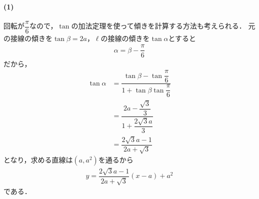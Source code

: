 \documentclass[../../main.tex]{subfiles}
\begin{document}
\paragraph{(1)}
回転が$\dfrac{\pi}{6}$なので，$\tan$の加法定理を使って傾きを計算する方法も考えられる．
元の接線の傾きを$\tan\beta=2a$，$\ell$の接線の傾きを$\tan\alpha$とすると
\begin{align}
  \alpha = \beta - \dfrac{\pi}{6}
\end{align}
だから，
\begin{align}
  \tan\alpha
  &= \dfrac{\tan\beta - \tan\dfrac{\pi}{6} }{1+\tan\beta\tan\dfrac{\pi}{6}} \\
  &= \dfrac{2a-\dfrac{\sqrt{3}}{3}}{1+\dfrac{2\sqrt{3}a}{3}} \\
  &= \dfrac{2\sqrt{3}a-1}{2a+\sqrt{3}}
\end{align}
となり，求める直線は$(a,a^2)$を通るから
\begin{align}
  y = \dfrac{2\sqrt{3}a-1}{2a+\sqrt{3}}\left(x-a\right)+a^2
\end{align}
である．

\newpage
\end{document}
